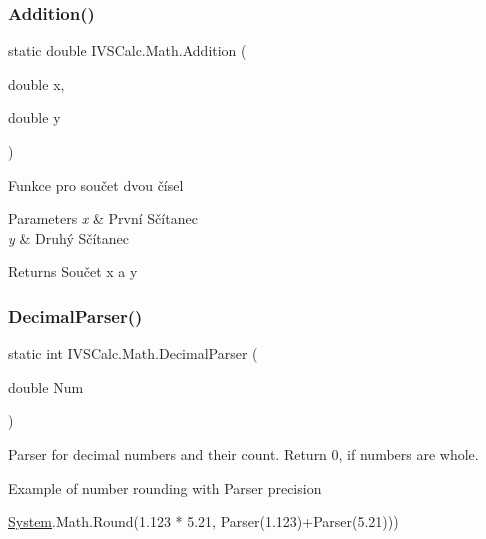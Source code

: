 \subsubsection{\texorpdfstring{Addition()}{Addition()}}
{\footnotesize\ttfamily static double I\+V\+S\+Calc.\+Math.\+Addition (\begin{DoxyParamCaption}\item[{double}]{x,  }\item[{double}]{y }\end{DoxyParamCaption})\hspace{0.3cm}{\ttfamily [static]}}



Funkce pro součet dvou čísel 


\begin{DoxyParams}{Parameters}
{\em x} & První Sčítanec\\
\hline
{\em y} & Druhý Sčítanec\\
\hline
\end{DoxyParams}
\begin{DoxyReturn}{Returns}
Součet x a y 
\end{DoxyReturn}
\mbox{\label{class_i_v_s_calc_1_1_math_a7ad6546f556d8dae510d5c69e3b2be6a}} 
\subsubsection{\texorpdfstring{Decimal\+Parser()}{DecimalParser()}}
{\footnotesize\ttfamily static int I\+V\+S\+Calc.\+Math.\+Decimal\+Parser (\begin{DoxyParamCaption}\item[{double}]{Num }\end{DoxyParamCaption})\hspace{0.3cm}{\ttfamily [static]}}



Parser for decimal numbers and their count. Return 0, if numbers are whole. 

Example of number rounding with Parser precision 
\begin{DoxyCode}
\hyperlink{namespace_system}{System}.Math.Round(1.123 * 5.21, Parser(1.123)+Parser(5.21)))
\end{DoxyCode}
 


